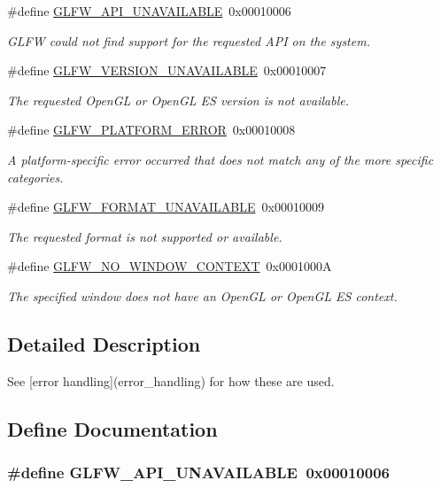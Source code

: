 \begin{CompactItemize}
\#define \hyperlink{group__errors_g56882b290db23261cc6c053c40c2d08e}{GLFW\_\-API\_\-UNAVAILABLE}~0x00010006
\begin{CompactList}\small\item\em GLFW could not find support for the requested API on the system. \item\end{CompactList}\item 
\#define \hyperlink{group__errors_gd16c5565b4a69f9c2a9ac2c0dbc89462}{GLFW\_\-VERSION\_\-UNAVAILABLE}~0x00010007
\begin{CompactList}\small\item\em The requested OpenGL or OpenGL ES version is not available. \item\end{CompactList}\item 
\#define \hyperlink{group__errors_gd44162d78100ea5e87cdd38426b8c7a1}{GLFW\_\-PLATFORM\_\-ERROR}~0x00010008
\begin{CompactList}\small\item\em A platform-specific error occurred that does not match any of the more specific categories. \item\end{CompactList}\item 
\#define \hyperlink{group__errors_g196e125ef261d94184e2b55c05762f14}{GLFW\_\-FORMAT\_\-UNAVAILABLE}~0x00010009
\begin{CompactList}\small\item\em The requested format is not supported or available. \item\end{CompactList}\item 
\#define \hyperlink{group__errors_gcff24d2757da752ae4c80bf452356487}{GLFW\_\-NO\_\-WINDOW\_\-CONTEXT}~0x0001000A
\begin{CompactList}\small\item\em The specified window does not have an OpenGL or OpenGL ES context. \item\end{CompactList}\end{CompactItemize}


\subsection{Detailed Description}
See \mbox{[}error handling\mbox{]}(error\_\-handling) for how these are used. 

\subsection{Define Documentation}
\hypertarget{group__errors_g56882b290db23261cc6c053c40c2d08e}{
\subsubsection[GLFW\_\-API\_\-UNAVAILABLE]{\setlength{\rightskip}{0pt plus 5cm}\#define GLFW\_\-API\_\-UNAVAILABLE~0x00010006}}
\label{group__errors_g56882b290db23261cc6c053c40c2d08e}


